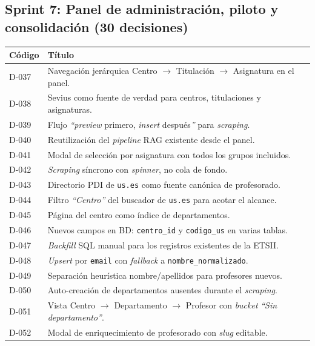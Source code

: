 \subsection*{Sprint 7: Panel de administración, piloto y consolidación (30 decisiones)}

\begin{longtable}{|p{1.3cm}|>{\raggedright\arraybackslash}p{12cm}|}
\hline
\textbf{Código} & \textbf{Título} \\ \hline
D-037 & Navegación jerárquica Centro $\rightarrow$ Titulación $\rightarrow$ Asignatura en el panel. \\ \hline
D-038 & Sevius como fuente de verdad para centros, titulaciones y asignaturas. \\ \hline
D-039 & Flujo \textit{``preview} primero, \textit{insert} después\textit{''} para \textit{scraping}. \\ \hline
D-040 & Reutilización del \textit{pipeline} RAG existente desde el panel. \\ \hline
D-041 & Modal de selección por asignatura con todos los grupos incluidos. \\ \hline
D-042 & \textit{Scraping} síncrono con \textit{spinner}, no cola de fondo. \\ \hline
D-043 & Directorio PDI de \texttt{us.es} como fuente canónica de profesorado. \\ \hline
D-044 & Filtro \textit{``Centro''} del buscador de \texttt{us.es} para acotar el alcance. \\ \hline
D-045 & Página del centro como índice de departamentos. \\ \hline
D-046 & Nuevos campos en BD: \texttt{centro\_id} y \texttt{codigo\_us} en varias tablas. \\ \hline
D-047 & \textit{Backfill} SQL manual para los registros existentes de la ETSII. \\ \hline
D-048 & \textit{Upsert} por \texttt{email} con \textit{fallback} a \texttt{nombre\_normalizado}. \\ \hline
D-049 & Separación heurística nombre/apellidos para profesores nuevos. \\ \hline
D-050 & Auto-creación de departamentos ausentes durante el \textit{scraping}. \\ \hline
D-051 & Vista Centro $\rightarrow$ Departamento $\rightarrow$ Profesor con \textit{bucket} \textit{``Sin departamento''}. \\ \hline
D-052 & Modal de enriquecimiento de profesorado con \textit{slug} editable. \\ \hline

\end{longtable}
